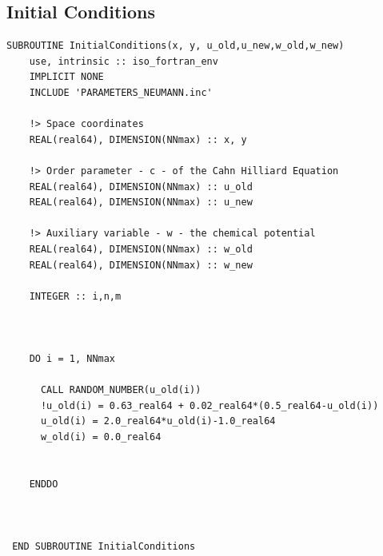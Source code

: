 \documentclass{article}
\begin{document}
\subsection{Initial Conditions}
\begin{verbatim}
SUBROUTINE InitialConditions(x, y, u_old,u_new,w_old,w_new)
    use, intrinsic :: iso_fortran_env
    IMPLICIT NONE
    INCLUDE 'PARAMETERS_NEUMANN.inc'
 
    !> Space coordinates
    REAL(real64), DIMENSION(NNmax) :: x, y
 
    !> Order parameter - c - of the Cahn Hilliard Equation
    REAL(real64), DIMENSION(NNmax) :: u_old
    REAL(real64), DIMENSION(NNmax) :: u_new
 
    !> Auxiliary variable - w - the chemical potential
    REAL(real64), DIMENSION(NNmax) :: w_old
    REAL(real64), DIMENSION(NNmax) :: w_new
 
    INTEGER :: i,n,m

 
 
    DO i = 1, NNmax

      CALL RANDOM_NUMBER(u_old(i))
      !u_old(i) = 0.63_real64 + 0.02_real64*(0.5_real64-u_old(i))
      u_old(i) = 2.0_real64*u_old(i)-1.0_real64
      w_old(i) = 0.0_real64
    

    ENDDO

  
 
 END SUBROUTINE InitialConditions
\end{verbatim}
\end{document}
